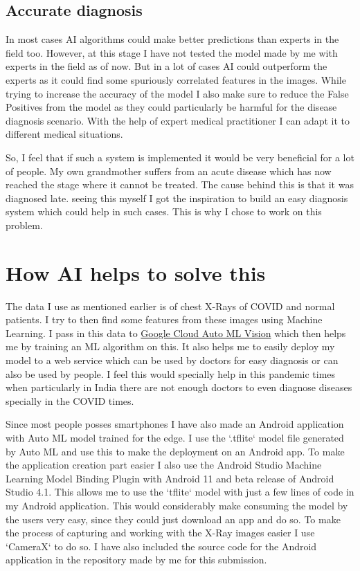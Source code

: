 \documentclass[a4paper]{article}
\begin{document}
\subsection{Accurate diagnosis}

\qquad In most cases AI algorithms could make better predictions than experts in the field too. However, at this stage I have not tested the model made by me with experts in the field as of now. But in a lot of cases AI could outperform the experts as it could find some spuriously correlated features in the images. While trying to increase the accuracy of the model I also make sure to reduce the False Positives from the model as they could particularly be harmful for the disease diagnosis scenario. With the help of expert medical practitioner I can adapt it to different medical situations.

\qquad So, I feel that if such a system is implemented it would be very beneficial for a lot of people. My own grandmother suffers from an acute disease which has now reached the stage where it cannot be treated. The cause behind this is that it was diagnosed late. seeing this myself I got the inspiration to build an easy diagnosis system which could help in such cases. This is why I chose to work on this problem.

\section{How AI helps to solve this}

\qquad The data I use as mentioned earlier is of chest X-Rays of COVID and normal patients. I try to then find some features from these images using Machine Learning. I pass in this data to \href{https://cloud.google.com/vision/automl/docs}{Google Cloud Auto ML Vision} which then helps me by training an ML algorithm on this. It also helps me to easily deploy my model to a web service which can be used by doctors for easy diagnosis or can also be used by people. I feel this would specially help in this pandemic times when particularly in India there are not enough doctors to even diagnose diseases specially in the COVID times.

\qquad Since most people posses smartphones I have also made an Android application with Auto ML model trained for the edge. I use the `.tflite` model file generated by Auto ML and use this to make the deployment on an Android app. To make the application creation part easier I also use the Android Studio Machine Learning Model Binding Plugin with Android 11 and beta release of Android Studio 4.1. This allows me to use the `tflite` model with just a few lines of code in my Android application. This would considerably make consuming the model by the users very easy, since they could just download an app and do so. To make the process of capturing and working with the X-Ray images easier I use `CameraX` to do so. I have also included the source code for the Android application in the repository made by me for this submission.
\end{document}
